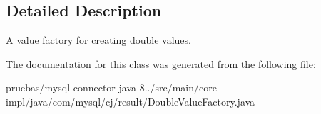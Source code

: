 \subsection{Detailed Description}
A value factory for creating double values. 

The documentation for this class was generated from the following file\+:\begin{DoxyCompactItemize}
\item 
pruebas/mysql-\/connector-\/java-\/8../src/main/core-\/impl/java/com/mysql/cj/result/Double\+Value\+Factory.\+java\end{DoxyCompactItemize}

